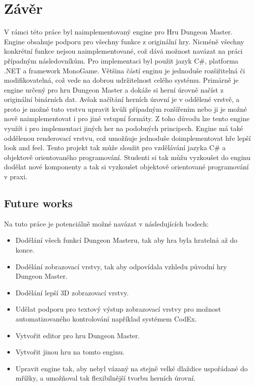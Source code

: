 \chapter*{Závěr}

V rámci této práce byl naimplementovaný engine pro Hru Dungeon Master. Engine 
obsahuje podporu pro všechny funkce z originální hry. Nicméně všechny konkrétní funkce
nejsou naimplementované, což dává možnost navázat na práci případným následovníkům. 
Pro implementaci byl použit jazyk C\#, platforma .NET a framework MonoGame. 
Většina částí enginu je jednoduše rozšiřitelná či modifikovatelná, což vede 
na dobrou udržitelnost celého systému. Primárně je engine určený pro hru 
Dungeon Master a dokáže si herní úrovně načíst z originální binárních dat. Avšak 
načítání herních úrovní je v oddělené vrstvě, a proto je možné tuto vrstvu upravit kvůli případným 
rozšířením nebo ji je možné nově naimplementovat i pro jiné vstupní formáty.
Z toho důvodu lze tento engine využít i pro implementaci jiných her na podobných principech.
Engine má také oddělenou renderovací vrstvu, což umožňuje jednoduše doimplementovat hře lepší look and feel.
Tento projekt tak může sloužit pro vzdělávání jazyka C\# a objektově orientovaného programování. 
Studenti si tak můžu vyzkoušet do enginu dodělat nové komponenty a tak si vyzkoušet objektově 
orientované programování v praxi.

\section*{Future works}
Na tuto práce je potenciálně možné navázat v následujících bodech:

\begin{itemize}
\item Dodělání všech funkcí Dungeon Masteru, tak aby hra byla hratelná až do konce.
\item Dodělání zobrazovací vrstvy, tak aby odpovídala vzhledu původní hry Dungeon Master.
\item Dodělání lepší 3D zobrazovací vrstvy.
\item Udělat podporu pro textový výstup zobrazovací vrstvy pro možnost automatizovaného kontrolování například systémem CodEx. 
\item Vytvořit editor pro hru Dungeon Master. 
\item Vytvořit jinou hru na tomto enginu.
\item Upravit engine tak, aby nebyl vázaný na stejně velké dlaždice uspořádané do mřížky, a umožňoval tak
	flexibilnější tvorbu herních úrovní. 
\end{itemize}




